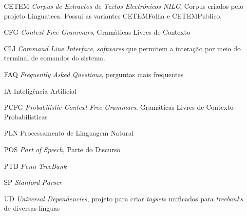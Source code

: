 \begin{siglas}  
  \item[CETEM] \textit{Corpus de Extractos de Textos Electrónicos NILC}, Corpus criados pelo projeto Linguateca. Possui as variantes CETEMFolha e CETEMPublico.
  \item[CFG] \textit{Context Free Grammars}, Gramáticas Livres de Contexto
  \item[CLI] \textit{Command Line Interface}, \textit{softwares} que permitem a interação por meio do terminal de comandos do sistema.
  \item[FAQ] \textit{Frequently Asked Questions}, perguntas mais frequentes
  \item[IA] Inteligência Artificial
  \item[PCFG] \textit{Probabilistic Context Free Grammars}, Gramáticas Livres de Contexto Probabilísticas
  \item[PLN] Processamento de Linguagem Natural
  \item[POS] \textit{Part of Speech}, Parte do Discurso
  \item[PTB] \textit{Penn TreeBank}
  \item[SP] \textit{Stanford Parser}
  \item[UD] \textit{Universal Dependencies}, projeto para criar \textit{tagsets} unificados para \textit{treebanks} de diversas línguas
  
\end{siglas}